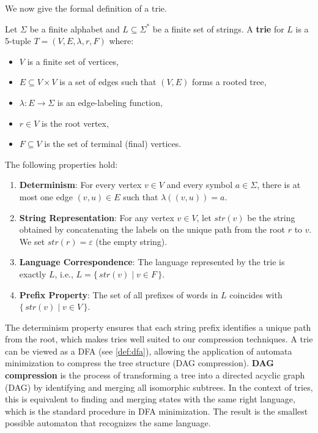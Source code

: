 We now give the formal definition of a trie.
\begin{definition}[Trie] \label{def:trie}
Let $\Sigma$ be a finite alphabet and $L \subseteq \Sigma^*$ be a finite set of strings. A \textbf{trie} for $L$ is a 5-tuple $T = (V, E, \lambda, r, F)$ where:
\begin{itemize}
    \item $V$ is a finite set of vertices,
    \item $E \subseteq V \times V$ is a set of edges such that $(V,E)$ forms a rooted tree,
    \item $\lambda: E \to \Sigma$ is an edge-labeling function,
    \item $r \in V$ is the root vertex,
    \item $F \subseteq V$ is the set of terminal (final) vertices.
\end{itemize}
The following properties hold:
\begin{enumerate}
    \item \textbf{Determinism}: For every vertex $v \in V$ and every symbol $a \in \Sigma$, there is at most one edge $(v, u) \in E$ such that $\lambda((v, u)) = a$.
    \item \textbf{String Representation}: For any vertex $v \in V$, let $str(v)$ be the string obtained by concatenating the labels on the unique path from the root $r$ to $v$. We set $str(r) = \varepsilon$ (the empty string).
    \item \textbf{Language Correspondence}: The language represented by the trie is exactly $L$, i.e., $L = \{\, str(v) \mid v \in F \,\}$.
    \item \textbf{Prefix Property}: The set of all prefixes of words in $L$ coincides with $\{\, str(v) \mid v \in V \,\}$.
\end{enumerate}
\end{definition}

The determinism property ensures that each string prefix identifies a unique path from the root, which makes tries well suited to our compression techniques. A trie can be viewed as a DFA (see \cref{def:dfa}), allowing the application of automata minimization to compress the tree structure (DAG compression). \textbf{DAG compression} is the process of transforming a tree into a directed acyclic graph (DAG) by identifying and merging all isomorphic subtrees. In the context of tries, this is equivalent to finding and merging states with the same right language, which is the standard procedure in DFA minimization. The result is the smallest possible automaton that recognizes the same language.

